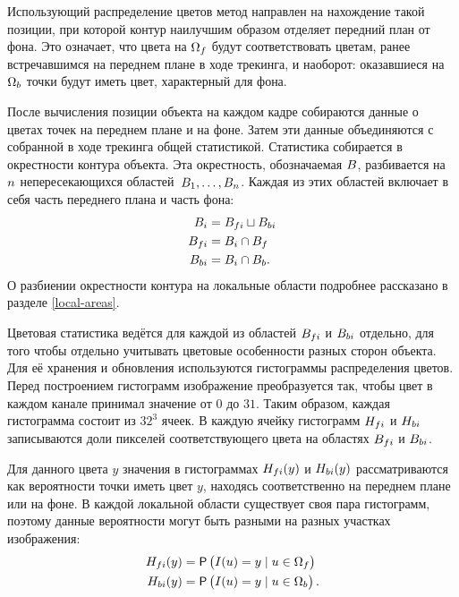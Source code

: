 
Использующий распределение цветов метод направлен на нахождение такой
позиции, при которой контур наилучшим образом отделяет передний план от фона.
Это означает, что цвета на $\Omega_f$ будут соответствовать цветам,
ранее встречавшимся на переднем плане в ходе трекинга, и наоборот:
оказавшиеся на $\Omega_b$ точки будут иметь цвет, характерный для фона.

После вычисления позиции объекта на каждом кадре собираются данные о цветах
точек на переднем плане и на фоне.
Затем эти данные объединяются с собранной в ходе трекинга общей статистикой.
Статистика собирается в окрестности контура объекта.
Эта окрестность, обозначаемая $B$, разбивается на $n$
непересекающихся областей~$B_1, \dots, B_{n}$.
Каждая из этих областей включает в себя часть переднего плана и часть фона:
\begin{align}\label{eqn:histo_partitioning}
    B_{i} &= {B_{fi}} \sqcup {\ensuremath{B_{bi}}} \\
    {B_{fi}} &= B_{i} \cap B_{f} \\
    {B_{bi}} &= B_{i} \cap B_{b}
\text{.}
\end{align}
О разбиении окрестности контура на локальные области подробнее рассказано в
разделе \ref{local-areas}.

Цветовая статистика ведётся для каждой из областей ${B_{fi}}$ и
${B_{bi}}$ отдельно, для того чтобы отдельно учитывать цветовые
особенности разных сторон объекта.
Для её хранения и обновления используются гистограммы распределения цветов.
Перед построением гистограмм изображение преобразуется так, чтобы цвет в каждом
канале принимал значение от $0$ до $31$.
Таким образом, каждая гистограмма состоит из $32^3$ ячеек.
В каждую ячейку гистограмм ${H_{fi}}$ и $H_{bi}{}$
записываются доли пикселей соответствующего цвета на областях $B_{fi}$
и $B_{bi}$.

Для данного цвета $y$ значения в гистограммах $H_{fi}(y)$ и
$H_{bi}(y)$ рассматриваются как вероятности точки иметь цвет $y$,
находясь соответственно на переднем плане или на фоне.
В каждой локальной области существует своя пара гистограмм, поэтому
данные вероятности могут быть разными на разных участках изображения:
\begin{align}\label{eqn:H_f_Y}
    H_{fi}(y) &= \mathsf{P} \left( I(\mathnormal{u}) = y \mid \mathnormal{u} \in \Omega_f \right) \\
    H_{bi}(y) &= \mathsf{P} \left( I(\mathnormal{u}) = y \mid \mathnormal{u} \in \Omega_b \right)
\text{.}
\end{align}

